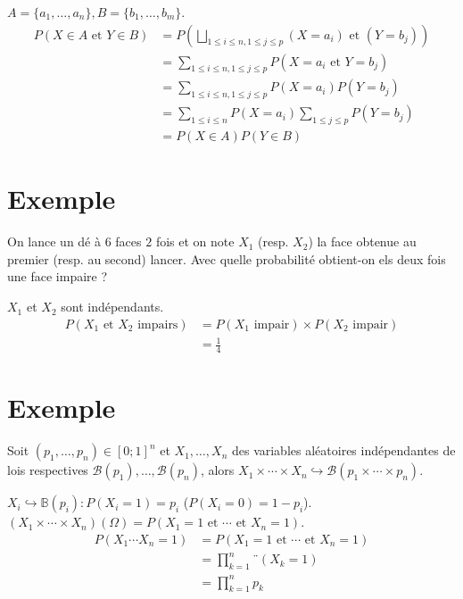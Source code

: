 \documentclass[../main.tex]{subfiles}
\begin{document}
\noindent $A = \{ a_1, \ldots, a_n \}, B = \{ b_1, \ldots, b_m \}$.
\begin{align*}
    P(X\in A \text{ et } Y\in B) &= P \left( \bigsqcup_{1\leq i\leq n, 1\leq j\leq p} (X = a_i) \text{ et } (Y = b_j) \right) \\
    &= \sum_{1\leq i\leq n, 1\leq j\leq p} P(X = a_i \text{ et } Y = b_j) \\
    &= \sum_{1\leq i\leq n, 1\leq j\leq p} P(X = a_i) P(Y = b_j) \\
    &= \sum_{1\leq i\leq n} P(X = a_i) \sum_{1\leq j\leq p} P(Y = b_j) \\
    &= P(X \in A) P(Y \in B)
\end{align*}

\section{Exemple}
\begin{tcolorbox}[title=Exemple 32.51, title filled=false, colframe=darkgreen, colback=darkgreen!10!white]
    On lance un dé à $6$ faces $2$ fois et on note $X_1$ (resp. $X_2$) la face obtenue au premier (resp. au second) lancer. Avec quelle probabilité obtient-on els deux fois une face impaire ?
\end{tcolorbox}

\noindent $X_1$ et $X_2$ sont indépendants. \\
\begin{align*}
    P(X_1 \text{ et } X_2 \text{ impairs}) &= P(X_1 \text{ impair}) \times P(X_2 \text{ impair}) \\
    &= \frac{1}{4}
\end{align*}

\section{Exemple}
\begin{tcolorbox}[title=Exemple , title filled=false, colframe=darkgreen, colback=darkgreen!10!white]
    Soit $\left(p_1, \ldots, p_n\right) \in[0 ; 1]^n$ et $X_1, \ldots, X_n$ des variables aléatoires indépendantes de lois respectives $\mathcal{B}\left(p_1\right), \ldots, \mathcal{B}\left(p_n\right)$, alors $X_1 \times \cdots \times X_n \hookrightarrow \mathcal{B}\left(p_1 \times \cdots \times p_n\right)$.
\end{tcolorbox}

\noindent $X_i\hookrightarrow \mathbb{B}(p_i) : P(X_i = 1) = p_i$ ($P(X_i = 0) = 1 - p_i$). \\
$(X_1\times \cdots \times X_n)(\Omega) = P(X_1 = 1 \text{ et } \cdots \text{ et } X_n = 1)$. 
\begin{align*}
    P(X_1\cdots X_n = 1) &= P(X_1 = 1 \text{ et } \cdots \text{ et } X_n = 1) \\
    &= \prod_{k=1}^{n} ¨(X_k = 1) \\
    &= \prod_{k=1}^{n} p_k
\end{align*}
\end{document}
